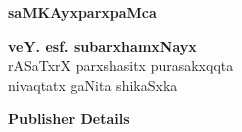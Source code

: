 \thispagestyle{empty}
\begin{center}
{\Huge\bfseries saMKAyxparxpaMca}%
\vfill


{\LARGE\bfseries veY. esf. subarxhamxNayx}\\[4pt]
{\large rASaTxrX parxshasitx purasakxqqta\\[4pt]
nivaqtatx gaNita shikaSxka}
\vfill

{\Large\rm\bfseries Publisher Details}





\end{center}
